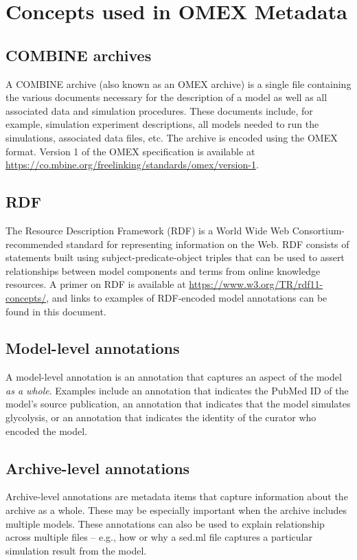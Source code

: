 \documentclass[pdftex,rgb,dvipsnames,svgnames,hyperref,table]{report}
\begin{document}
\label{sec:conventions}

\section{Concepts used in OMEX Metadata}
\subsection{COMBINE archives}
A COMBINE archive (also known as an OMEX archive) is a single file containing the various documents necessary for the description of a model as well as all associated data and simulation procedures. These documents include, for example, simulation experiment descriptions, all models needed to run the simulations, associated data files, etc. The archive is encoded using the OMEX format. Version 1 of the OMEX specification is available at \url{https://co.mbine.org/freelinking/standards/omex/version-1}.

\subsection{RDF}
The Resource Description Framework (RDF) is a World Wide Web Consortium-recommended standard for representing information on the Web. RDF consists of statements built using subject-predicate-object triples that can be used to assert relationships between model components and terms from online knowledge resources. A primer on RDF is available at \url{https://www.w3.org/TR/rdf11-concepts/}, and links to examples of RDF-encoded model annotations can be found in this document.

\subsection{Model-level annotations}
A model-level annotation is an annotation that captures an aspect of the model \textit{as a whole}. Examples include an annotation that indicates the PubMed ID of the model's source publication, an annotation that indicates that the model simulates glycolysis, or an annotation that indicates the identity of the curator who encoded the model. 

\subsection{Archive-level annotations}
Archive-level annotations are metadata items that capture information about the archive as a whole. These may be especially important when the archive includes multiple models. These annotations can also be used to explain relationship across multiple files -- e.g., how or why a sed.ml file captures a particular simulation result from the model.
\end{document}
